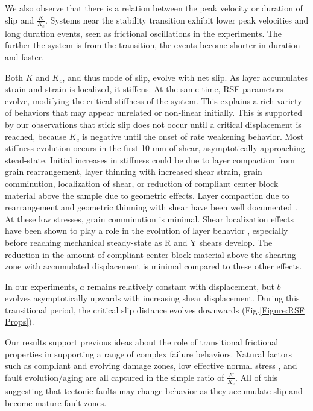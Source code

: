 \documentclass[11pt]{article}
\begin{document}
We also observe that there is a relation between the peak velocity or duration
of slip and $\frac{K}{K_c}$. Systems near the stability transition exhibit
lower peak velocities and long duration events, seen as frictional oscillations
in the experiments. The further the system is from the transition, the events
become shorter in duration and faster.

Both $K$ and $K_c$, and thus mode of slip, evolve with net slip. As layer
accumulates strain and strain is localized, it stiffens. At the same time, RSF
parameters evolve, modifying the critical stiffness of the system. This explains
a rich variety of behaviors that may appear unrelated or non-linear initially.
This is supported by our observations that stick slip does not occur until a
critical displacement is reached, because $K_c$ is negative until the onset of rate
weakening behavior. Most stiffness evolution occurs in the first 10 mm of shear,
asymptotically approaching stead-state. Initial increases in stiffness could be
due to layer compaction from grain rearrangement, layer thinning with increased
shear strain, grain comminution, localization of shear, or reduction of
compliant center block material above the sample due to geometric effects. Layer
compaction due to rearrangement and geometric thinning with shear have been well
documented \cite{Scott:1994}.  At these low stresses, grain comminution is
minimal. Shear localization effects have been shown to play a role in the
evolution of layer behavior \cite{Logan:1992}, especially before reaching
mechanical steady-state as R and Y shears develop. The reduction in the amount
of compliant center block material above the shearing zone with accumulated
displacement is minimal compared to these other effects.

In our experiments, $a$ remains relatively constant with displacement, but $b$
evolves asymptotically upwards with increasing shear displacement. During this
transitional period, the critical slip distance evolves downwards
(Fig.\ref{Figure:RSF Props}).

Our results support previous ideas about the role of transitional frictional
properties in supporting a range of complex failure behaviors. Natural factors
such as compliant and evolving damage zones, low effective normal stress
\cite{audet2009seismic,kitajima2012elevated,shelly2015complexity},
and fault evolution/aging \cite{ikari2011relation} are all captured in the
simple ratio of $\frac{K}{K_c}$.  All of this
suggesting that tectonic faults may change behavior as they accumulate slip and
become mature fault zones.
\end{document}
